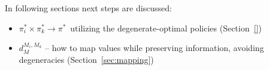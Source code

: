 In following sections next steps are discussed:
\begin{itemize}
\item $\pi^\ast_i \times \pi^\ast_k \to \pi^\ast${\ }utilizing the degenerate-optimal policies (Section~\ref{})
\item $d^{M_i, M_k}_{M}$ -- how to map values while preserving information, avoiding degeneracies (Section~\ref{sec:mapping})
\end{itemize}
